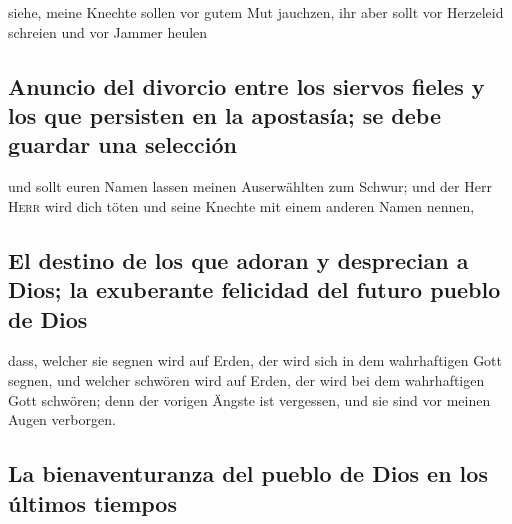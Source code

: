 siehe, meine Knechte sollen vor gutem Mut jauchzen, ihr
aber sollt vor Herzeleid schreien und vor Jammer heulen

\hypertarget{anuncio-del-divorcio-entre-los-siervos-fieles-y-los-que-persisten-en-la-apostasuxeda-se-debe-guardar-una-selecciuxf3n}{%
\subsection{Anuncio del divorcio entre los siervos fieles y los que
persisten en la apostasía; se debe guardar una
selección}\label{anuncio-del-divorcio-entre-los-siervos-fieles-y-los-que-persisten-en-la-apostasuxeda-se-debe-guardar-una-selecciuxf3n}}

 und sollt euren Namen lassen meinen Auserwählten zum
Schwur; und der Herr \textsc{Herr} wird dich töten und seine Knechte mit
einem anderen Namen nennen,

\hypertarget{el-destino-de-los-que-adoran-y-desprecian-a-dios-la-exuberante-felicidad-del-futuro-pueblo-de-dios}{%
\subsection{El destino de los que adoran y desprecian a Dios; la
exuberante felicidad del futuro pueblo de
Dios}\label{el-destino-de-los-que-adoran-y-desprecian-a-dios-la-exuberante-felicidad-del-futuro-pueblo-de-dios}}

 dass, welcher sie segnen wird auf Erden, der wird sich
in dem wahrhaftigen Gott segnen, und welcher schwören wird auf Erden,
der wird bei dem wahrhaftigen Gott schwören; denn der vorigen Ängste ist
vergessen, und sie sind vor meinen Augen verborgen.

\hypertarget{la-bienaventuranza-del-pueblo-de-dios-en-los-uxfaltimos-tiempos}{%
\subsection{La bienaventuranza del pueblo de Dios en los últimos
tiempos}\label{la-bienaventuranza-del-pueblo-de-dios-en-los-uxfaltimos-tiempos}}

